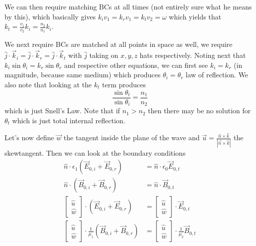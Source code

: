 \documentclass[10pt]{report}
\newcommand{\abs}[1]{\left|#1\right|}
\begin{document}
We can then require matching BCs at all times (not entirely sure what he means by this), which basically gives $k_iv_1 = k_rv_1 = k_tv_2 = \omega$ which yields that $k_t = \frac{v_1}{v_2}k_i = \frac{n_2}{n_1}k_i$.

We next require BCs are matched at all points in space as well, we require $\hat{j} \cdot \vec{k}_i = \hat{j} \cdot \vec{k}_r = \hat{j} \cdot \vec{k}_t$ with $\hat{j}$ taking on $x,y,z$ hats respectively. Noting next that $k_i \sin \theta_i = k_r\sin \theta_r$ and respective other equations, we can first see $k_i = k_r$ (in magnitude, because same medium) which produces $\theta_i = \theta_r$ law of reflection. We also note that looking at the $k_t$ term produces
\begin{equation}
    \frac{\sin \theta_t}{\sin \theta_i} = \frac{n_1}{n_2}
\end{equation}
which is just Snell's Law. Note that if $n_1 > n_2$ then there may be no solution for $\theta_t$ which is just total internal reflection. 

Let's now define $\vec{w}$ the tangent inside the plane of the wave and $\vec{u} = \frac{\hat{n} \times \hat{k}}{\abs{\vec{n} \times \hat{k}}}$ the skewtangent. Then we can look at the boundary conditions
\begin{align}
    \hat{n} \cdot \epsilon_1\left( \vec{E}_{0,i} + \vec{E}_{0,r} \right) &= \hat{n} \cdot \epsilon_0 \vec{E}_{0,t}\\
    \hat{n} \cdot\left( \vec{B}_{0,i} + \vec{B}_{0,r} \right) &= \hat{n} \cdot \vec{B}_{0,t}\\
    \begin{bmatrix} \hat{u}\\ \hat{w} \end{bmatrix}  \cdot \left( \vec{E}_{0,i} + \vec{E}_{0,r} \right) &= \begin{bmatrix} \hat{u}\\ \hat{w} \end{bmatrix}  \cdot \vec{E}_{0,t}\\
    \begin{bmatrix} \hat{u}\\ \hat{w} \end{bmatrix}  \cdot \frac{1}{\mu_1} \left( \vec{B}_{0,i} + \vec{B}_{0,r} \right) &= \begin{bmatrix} \hat{u}\\ \hat{w} \end{bmatrix}  \cdot \frac{1}{\mu_2}\vec{B}_{0,t}
\end{align}
\end{document}
